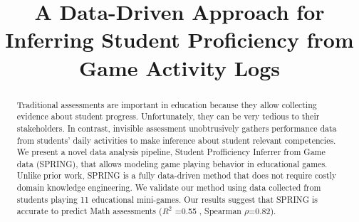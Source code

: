 \documentclass{sigchi}
\def\algname{SPRING\xspace}
\def\plaintitle{A Data-Driven Approach for Inferring Student Proficiency from Game Activity Logs  }
\begin{document}
\title{\plaintitle}

\author
{%
}

  
\maketitle

\begin{abstract}
Traditional assessments are important in education because they allow collecting evidence about student progress. 
Unfortunately, they can be very tedious to their stakeholders.
In contrast, invisible assessment  unobtrusively gathers  performance data from students' daily activities to make inference about student relevant competencies.
We present a novel data analysis pipeline, {Student Profficiency Inferrer from Game data} (\algname), that allows modeling  game playing behavior in educational games.
Unlike prior work, \algname is a fully data-driven method that does not require costly domain knowledge engineering.
We validate our method using data collected from students playing 11 educational mini-games.
Our results suggest that  \algname is accurate to predict Math assessments ($R^2$ =0.55 , Spearman $\rho$=0.82).
\end{abstract}

{}
\end{document}
